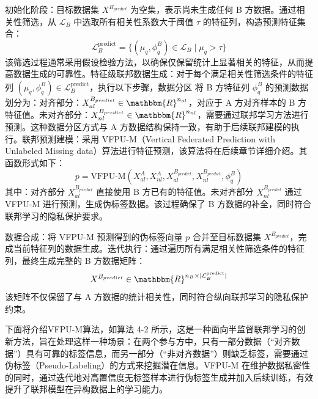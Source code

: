 初始化阶段：目标数据集 $X^{B_{predict}}$ 为空集，表示尚未生成任何 B 方数据。通过相关性筛选，从 $\mathcal{L}_B$ 中选取所有相关性系数大于阈值 $\tau$ 的特征列，构造预测特征集合：
\begin{equation}
	\mathcal{L}_B^{\text{predict}} = \{(\mu_q, \phi^B_q) \in \mathcal{L}_B \mid \mu_q > \tau\}
\end{equation}
该筛选过程通常采用假设检验方法，以确保仅保留统计上显著相关的特征，从而提高数据生成的可靠性。特征级联邦数据生成：对于每个满足相关性筛选条件的特征列 $(\mu_q, \phi^B_q) \in \mathcal{L}_B^{\text{predict}}$，执行以下步骤，数据分区  将 B 方特征列 $\phi^B_q$ 的预测数据划分为：对齐部分：$X_{al}^{B_{predict}} \in \mathbbm{R}^{n_{al}}$，对应于 A 方对齐样本的 B 方特征值。未对齐部分：$X_{nl}^{B_{predict}} \in \mathbbm{R}^{n_{nl}}$，需要通过联邦学习方法进行预测。这种数据分区方式与 A 方数据结构保持一致，有助于后续联邦建模的执行。联邦预测建模：采用 VFPU-M（Vertical Federated Prediction with Unlabeled Missing data）算法进行特征预测，该算法将在后续章节详细介绍。其函数形式如下：
\begin{equation}
	p = \text{VFPU-M}(X_{al}^A, X_{nl}^A, X_{al}^{B_{predict}}, X_{nl}^{B_{predict}}, \phi^B_q)
\end{equation}
其中：对齐部分 $X_{al}^{B_{predict}}$ 直接使用 B 方已有的特征值。未对齐部分 $X_{nl}^{B_{predict}}$ 通过 VFPU-M 进行预测，生成伪标签数据。该过程确保了 B 方数据的补全，同时符合联邦学习的隐私保护要求。

数据合成：将 VFPU-M 预测得到的伪标签向量 $p$ 合并至目标数据集 $X^{B_{predict}}$，完成当前特征列的数据生成。迭代执行：通过遍历所有满足相关性筛选条件的特征列，最终生成完整的 B 方数据矩阵：
\begin{equation}
	X^{B_{predict}} \in \mathbbm{R}^{n_B \times |\mathcal{L}_B^{\text{predict}}|}
\end{equation}
该矩阵不仅保留了与 A 方数据的统计相关性，同时符合纵向联邦学习的隐私保护约束。

下面将介绍VFPU-M算法，如算法 4-2 所示，这是一种面向半监督联邦学习的创新方法，旨在处理这样一种场景：在两个参与方中，只有一部分数据（“对齐数据”）具有可靠的标签信息，而另一部分（“非对齐数据”）则缺乏标签，需要通过伪标签（Pseudo-Labeling）的方式来挖掘潜在信息。VFPU-M 在维护数据私密性的同时，通过迭代地对高置信度无标签样本进行伪标签生成并加入后续训练，有效提升了联邦模型在异构数据上的学习能力。


